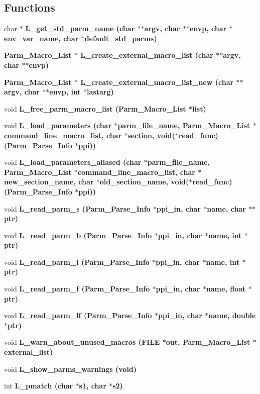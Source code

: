\subsection*{Functions}
\begin{CompactItemize}
\item 
char $\ast$ \bf{L\_\-get\_\-std\_\-parm\_\-name} (char $\ast$$\ast$argv, char $\ast$$\ast$envp, char $\ast$env\_\-var\_\-name, char $\ast$default\_\-std\_\-parms)
\item 
\bf{Parm\_\-Macro\_\-List} $\ast$ \bf{L\_\-create\_\-external\_\-macro\_\-list} (char $\ast$$\ast$argv, char $\ast$$\ast$envp)
\item 
\bf{Parm\_\-Macro\_\-List} $\ast$ \bf{L\_\-create\_\-external\_\-macro\_\-list\_\-new} (char $\ast$$\ast$argv, char $\ast$$\ast$envp, int $\ast$lastarg)
\item 
void \bf{L\_\-free\_\-parm\_\-macro\_\-list} (\bf{Parm\_\-Macro\_\-List} $\ast$\bf{list})
\item 
void \bf{L\_\-load\_\-parameters} (char $\ast$parm\_\-file\_\-name, \bf{Parm\_\-Macro\_\-List} $\ast$command\_\-line\_\-macro\_\-list, char $\ast$section, void($\ast$read\_\-func)(\bf{Parm\_\-Parse\_\-Info} $\ast$ppi))
\item 
void \bf{L\_\-load\_\-parameters\_\-aliased} (char $\ast$parm\_\-file\_\-name, \bf{Parm\_\-Macro\_\-List} $\ast$command\_\-line\_\-macro\_\-list, char $\ast$new\_\-section\_\-name, char $\ast$old\_\-section\_\-name, void($\ast$read\_\-func)(\bf{Parm\_\-Parse\_\-Info} $\ast$ppi))
\item 
void \bf{L\_\-read\_\-parm\_\-s} (\bf{Parm\_\-Parse\_\-Info} $\ast$ppi\_\-in, char $\ast$\bf{name}, char $\ast$$\ast$ptr)
\item 
void \bf{L\_\-read\_\-parm\_\-b} (\bf{Parm\_\-Parse\_\-Info} $\ast$ppi\_\-in, char $\ast$\bf{name}, int $\ast$ptr)
\item 
void \bf{L\_\-read\_\-parm\_\-i} (\bf{Parm\_\-Parse\_\-Info} $\ast$ppi\_\-in, char $\ast$\bf{name}, int $\ast$ptr)
\item 
void \bf{L\_\-read\_\-parm\_\-f} (\bf{Parm\_\-Parse\_\-Info} $\ast$ppi\_\-in, char $\ast$\bf{name}, float $\ast$ptr)
\item 
void \bf{L\_\-read\_\-parm\_\-lf} (\bf{Parm\_\-Parse\_\-Info} $\ast$ppi\_\-in, char $\ast$\bf{name}, double $\ast$ptr)
\item 
void \bf{L\_\-warn\_\-about\_\-unused\_\-macros} (FILE $\ast$out, \bf{Parm\_\-Macro\_\-List} $\ast$external\_\-list)
\item 
void \bf{L\_\-show\_\-parms\_\-warnings} (void)
\item 
int \bf{L\_\-pmatch} (char $\ast$s1, char $\ast$s2)
\end{CompactItemize}
